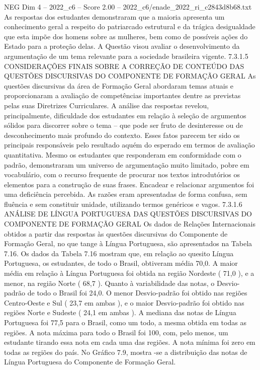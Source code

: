 \begin{textsample}{NEG Dim 4 – 2022\_c6 – Score 2.00 – 2022\_c6/enade\_2022\_ri\_c2843d8b68.txt}
As respostas dos estudantes demonstraram que a maioria apresenta um conhecimento geral a respeito do patriarcado estrutural e da trágica desigualdade que esta impõe dos homens sobre as mulheres, bem como de possíveis ações do Estado para a proteção delas.
A Questão visou avaliar o desenvolvimento da argumentação de um tema relevante para a sociedade brasileira vigente. 7.3.1.5 CONSIDERAÇÕES FINAIS SOBRE A CORREÇÃO DE CONTEÚDO DAS QUESTÕES DISCURSIVAS DO COMPONENTE DE FORMAÇÃO GERAL As questões discursivas da área de Formação Geral abordaram temas atuais e proporcionaram a avaliação de competências importantes dentre as previstas pelas suas Diretrizes Curriculares.
A análise das respostas revelou, principalmente, dificuldade dos estudantes em relação à seleção de argumentos sólidos para discorrer sobre o tema – que pode ser fruto de desinteresse ou de desconhecimento mais profundo do contexto.
Esses fatos parecem ter sido os principais responsáveis pelo resultado aquém do esperado em termos de avaliação quantitativa.
Mesmo os estudantes que responderam em conformidade com o padrão, demonstraram um universo de argumentação muito limitado, pobre em vocabulário, com o recurso frequente de procurar nos textos introdutórios os elementos para a construção de suas frases.
Encadear e relacionar argumentos foi uma deficiência percebida.
As razões eram apresentadas de forma confusa, sem fluência e sem constituir unidade, utilizando termos genéricos e vagos. 7.3.1.6 ANÁLISE DE LÍNGUA PORTUGUESA DAS QUESTÕES DISCURSIVAS DO COMPONENTE DE FORMAÇÃO GERAL Os dados de Relações Internacionais obtidos a partir das respostas às questões discursivas do Componente de Formação Geral, no que tange à Língua Portuguesa, são apresentados na Tabela 7.16.
Os dados da Tabela 7.16 mostram que, em relação ao quesito Língua Portuguesa, os estudantes, de todo o Brasil, obtiveram média 70,0.
A maior média em relação à Língua Portuguesa foi obtida na região Nordeste ( 71,0 ), e a menor, na região Norte ( 68,7 ).
Quanto à variabilidade das notas, o Desvio-padrão de todo o Brasil foi 24,0.
O menor Desvio-padrão foi obtido nas regiões Centro-Oeste e Sul ( 23,7 em ambas ), e o maior Desvio-padrão foi obtido nas regiões Norte e Sudeste ( 24,1 em ambas ).
A mediana das notas de Língua Portuguesa foi 77,5 para o Brasil, como um todo, a mesma obtida em todas as regiões.
A nota máxima para todo o Brasil foi 100, com, pelo menos, um estudante tirando essa nota em cada uma das regiões.
A nota mínima foi zero em todas as regiões do país.
No Gráfico 7.9, mostra -se a distribuição das notas de Língua Portuguesa do Componente de Formação Geral.

\end{textsample}
